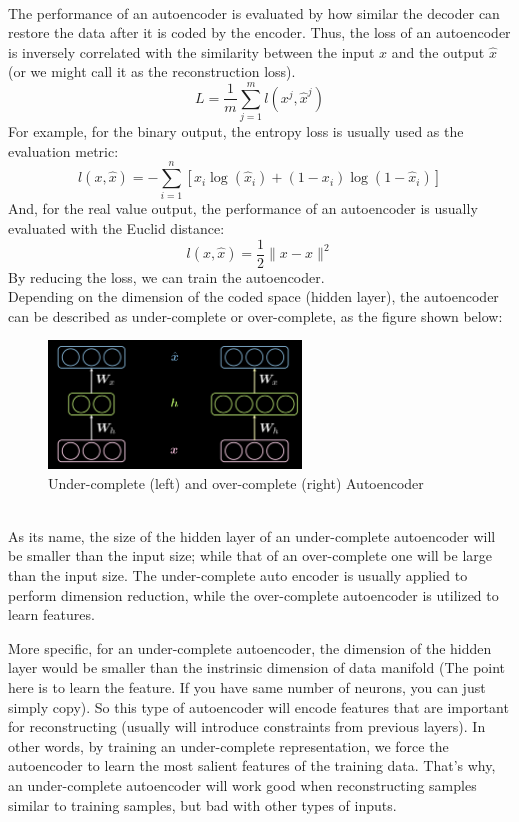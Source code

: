 \\
The performance of an autoencoder is evaluated by how similar the decoder can restore the data after it is coded by the encoder. Thus, the loss of an autoencoder is inversely correlated with the similarity between the input $x$ and the output $\hat{x}$ (or we might call it as the reconstruction loss). 
$$ L=\frac{1}{m}\sum_{j=1}^m l(x^j,\hat{x}^j) $$
For example, for the binary output, the entropy loss is usually used as the evaluation metric:
$$ l(x,\hat{x}) = -\sum_{i=1}^n[x_i\log(\hat{x}_i) + (1-x_i)\log(1-\hat{x}_i) ]$$
And, for the real value output, the performance of an autoencoder is usually evaluated with the Euclid distance:
$$ l(x,\hat{x}) = \frac{1}{2} \| x-\hat{x} \|^2 $$
By reducing the loss, we can train the autoencoder.
\\
Depending on the dimension of the coded space (hidden layer), the autoencoder can be described as under-complete or over-complete, as the figure shown below:
\\
\begin{figure}[htb]
    \centering
    \includegraphics[width=0.6\textwidth]{labs/10/images/Under_(over)_complete_Autoencoder.png}
    \caption{Under-complete (left) and over-complete (right) Autoencoder}
    \label{fig:Under_(over)_complete_Autoencoder}
\end{figure}
\\
As its name, the size of the hidden layer of an under-complete autoencoder will be smaller than the input size; while that of an over-complete one will be large than the input size. The under-complete auto encoder is usually applied to perform dimension reduction, while the over-complete autoencoder is utilized to learn features.

More specific, for an under-complete autoencoder, the dimension of the hidden layer would be smaller than the instrinsic dimension of data manifold (The point here is to learn the feature. If you have same number of neurons, you can just simply copy). So this type of autoencoder will encode features that are important for reconstructing (usually will introduce constraints from previous layers). In other words, by training an under-complete representation, we force the autoencoder to learn the most salient features of the training data. That's why, an under-complete autoencoder will work good when reconstructing samples similar to training samples, but bad with other types of inputs.  

